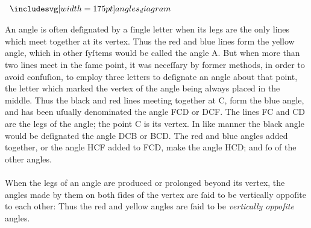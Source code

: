 \begin{minipage}{0.33\textwidth}
    \hspace{-40pt}$\img[0][0][175]{angles_diagram}$
\end{minipage}%
\begin{minipage}{0.67\textwidth}
    \raggedright An angle is often deſignated by a ſingle letter when its legs are the only lines which meet together at its vertex. Thus the red and blue lines form the yellow angle, which in other ſyſtems would be called the angle A. But when more than two lines meet in the ſame point, it was neceſſary by former methods, in order to avoid confuſion, to employ three letters to deſignate an angle about that point, the letter which marked the vertex of the angle being always placed in the middle. Thus the black and red lines meeting together at C, form the blue angle, and has been uſually denominated the angle FCD or DCF. The lines FC and CD are the legs of the angle; the point C is its vertex. In like manner the black angle would be deſignated the angle DCB or BCD. The red and blue angles added together, or the angle HCF added to FCD, make the angle HCD; and ſo of the other angles.\\
    \hfill\\
    When the legs of an angle are produced or prolonged beyond its vertex, the angles made by them on both ſides of the vertex are ſaid to be vertically oppoſite to each other: Thus the red and yellow angles are ſaid to be \textit{vertically oppoſite} angles.\\
\end{minipage}

\pagebreak

